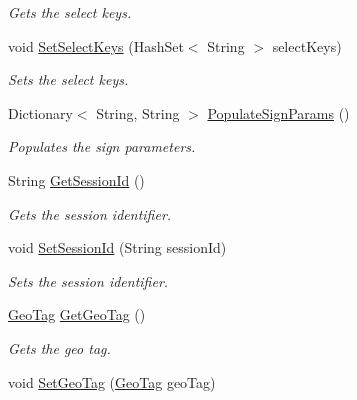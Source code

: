 \begin{DoxyCompactItemize}
\begin{DoxyCompactList}\small\item\em Gets the select keys. \end{DoxyCompactList}\item 
void \hyperlink{classcom_1_1shephertz_1_1app42_1_1paas_1_1sdk_1_1csharp_1_1_app42_service_a3830e4b8e438acc5285f7bfe8753866e}{Set\+Select\+Keys} (Hash\+Set$<$ String $>$ select\+Keys)
\begin{DoxyCompactList}\small\item\em Sets the select keys. \end{DoxyCompactList}\item 
Dictionary$<$ String, String $>$ \hyperlink{classcom_1_1shephertz_1_1app42_1_1paas_1_1sdk_1_1csharp_1_1_app42_service_afeab925d3c5d9c79dd1e391ffa79c433}{Populate\+Sign\+Params} ()
\begin{DoxyCompactList}\small\item\em Populates the sign parameters. \end{DoxyCompactList}\item 
String \hyperlink{classcom_1_1shephertz_1_1app42_1_1paas_1_1sdk_1_1csharp_1_1_app42_service_abc6eecc78186568601dfa7b1f823b585}{Get\+Session\+Id} ()
\begin{DoxyCompactList}\small\item\em Gets the session identifier. \end{DoxyCompactList}\item 
void \hyperlink{classcom_1_1shephertz_1_1app42_1_1paas_1_1sdk_1_1csharp_1_1_app42_service_a0cafec75a54c27fdff648fd52abd72de}{Set\+Session\+Id} (String session\+Id)
\begin{DoxyCompactList}\small\item\em Sets the session identifier. \end{DoxyCompactList}\item 
\hyperlink{classcom_1_1shephertz_1_1app42_1_1paas_1_1sdk_1_1csharp_1_1storage_1_1_geo_tag}{Geo\+Tag} \hyperlink{classcom_1_1shephertz_1_1app42_1_1paas_1_1sdk_1_1csharp_1_1_app42_service_a0d6e8d746584300e0903e556aae14280}{Get\+Geo\+Tag} ()
\begin{DoxyCompactList}\small\item\em Gets the geo tag. \end{DoxyCompactList}\item 
void \hyperlink{classcom_1_1shephertz_1_1app42_1_1paas_1_1sdk_1_1csharp_1_1_app42_service_a1003d9b1fdd05b66aaae9154b2224566}{Set\+Geo\+Tag} (\hyperlink{classcom_1_1shephertz_1_1app42_1_1paas_1_1sdk_1_1csharp_1_1storage_1_1_geo_tag}{Geo\+Tag} geo\+Tag)

\end{DoxyCompactItemize}
